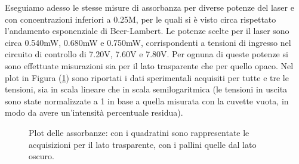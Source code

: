 \documentclass[10pt,letterpaper]{article}
\begin{document}
Eseguiamo adesso le stesse misure di assorbanza per diverse potenze del laser e con concentrazioni inferiori a 0.25M, per le quali si è visto circa rispettato l'andamento esponenziale di Beer-Lambert. Le potenze scelte per il laser sono circa 0.540mW, 0.680mW e 0.750mW, corrispondenti a tensioni di ingresso nel circuito di controllo di 7.20V, 7.60V e 7.80V. Per ognuna di queste potenze si sono effettuate misurazioni sia per il lato trasparente che per quello opaco. Nel plot in Figura (\ref{es9_concentrazioni}) sono riportati i dati sperimentali acquisiti per tutte e tre le tensioni, sia in scala lineare che in scala semilogaritmica (le tensioni in uscita sono state normalizzate a 1 in base a quella misurata con la cuvette vuota, in modo da avere un'intensità percentuale residua). \\



\begin{figure}
\centering
{}
{}

\caption{Plot delle assorbanze: con i quadratini sono rappresentate le acquisizioni per il lato trasparente, con i pallini quelle dal lato oscuro.}
\label{es9_concentrazioni}
\end{figure}
\end{document}
